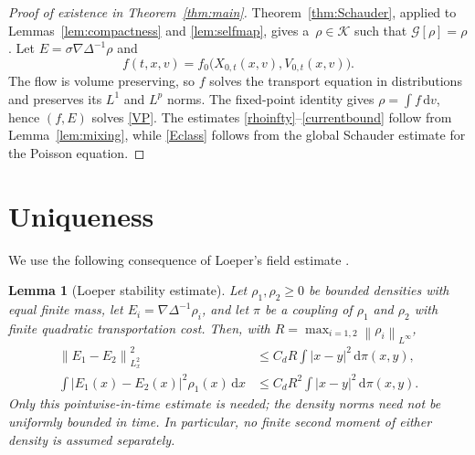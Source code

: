 \documentclass[11pt]{article}
\newtheorem{lemma}[theorem]{Lemma}
\newcommand{\norm}[1]{\left\lVert #1\right\rVert}
\newcommand{\abs}[1]{\left\lvert #1\right\rvert}
\newcommand{\dd}{\,\mathrm d}
\begin{document}
\begin{proof}[Proof of existence in Theorem~\ref{thm:main}]
Theorem~\ref{thm:Schauder}, applied to
Lemmas~\ref{lem:compactness} and \ref{lem:selfmap}, gives a\ 
$\rho\in\mathcal K$ such that $\mathcal G[\rho]=\rho$.  Let
$E=\sigma\nabla\Delta^{-1}\rho$ and
\begin{equation*}
 f(t,x,v)=f_0\bigl(X_{0,t}(x,v),V_{0,t}(x,v)\bigr).
\end{equation*}
The flow is volume preserving, so $f$ solves the transport equation in
distributions and preserves its $L^1$ and $L^p$ norms.  The fixed-point
identity gives $\rho=\int f\dd v$, hence $(f,E)$ solves \eqref{VP}.
The estimates \eqref{rhoinfty}--\eqref{currentbound} follow from
Lemma~\ref{lem:mixing}, while \eqref{Eclass} follows from the global
Schauder estimate for the Poisson equation.
\end{proof}

\section{Uniqueness}\label{sec:uniqueness}

We use the following consequence of Loeper's field estimate
\cite{Loeper}.

\begin{lemma}[Loeper stability estimate]\label{lem:loeper}
Let $\rho_1,\rho_2\geq0$ be bounded densities with equal finite mass, let
$E_i=\nabla\Delta^{-1}\rho_i$, and let $\pi$ be a coupling of $\rho_1$ and
$\rho_2$ with finite quadratic transportation cost.  Then, with
 $R=\max_{i=1,2}\norm{\rho_i}_{L^\infty}$,
\begin{align}
 \norm{E_1-E_2}_{L^2_x}^2
 &\leq C_d R\int\abs{x-y}^2\dd\pi(x,y),\label{loeper-L2}\\
 \int\abs{E_1(x)-E_2(x)}^2\rho_1(x)\dd x
 &\leq C_d R^2\int\abs{x-y}^2\dd\pi(x,y).
 \label{loeper}
\end{align}
Only this pointwise-in-time estimate is needed; the density norms need not be
uniformly bounded in time.   In particular, no finite second moment of either
density is assumed separately.
\end{lemma}
\end{document}
